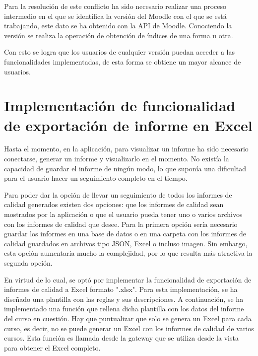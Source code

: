 Para la resolución de este conflicto ha sido necesario realizar una proceso intermedio en el que se identifica la versión del Moodle con el que se está trabajando, este dato se ha obtenido con la API de Moodle\cite{moodle-api}. Conociendo la versión se realiza la operación de obtención de índices de una forma u otra.

Con esto se logra que los usuarios de cualquier versión puedan acceder a las funcionalidades implementadas, de esta forma se obtiene un mayor alcance de usuarios.

\section{Implementación de funcionalidad de exportación de informe en Excel}
Hasta el momento, en la aplicación, para visualizar un informe ha sido necesario conectarse, generar un informe y visualizarlo en el momento. No existía la capacidad de guardar el informe de ningún modo, lo que suponía una dificultad para el usuario hacer un seguimiento completo en el tiempo. 

Para poder dar la opción de llevar un seguimiento de todos los informes de calidad generados existen dos opciones: que los informes de calidad sean mostrados por la aplicación o que el usuario pueda tener uno o varios archivos con los informes de calidad que desee. Para la primera opción sería necesario guardar los informes en una base de datos o en una carpeta con los informes de calidad guardados en archivos tipo JSON, Excel o incluso imagen. Sin embargo, esta opción aumentaría mucho la complejidad, por lo que resulta más atractiva la segunda opción.

En virtud de lo cual, se optó por implementar la funcionalidad de exportación de informes de calidad a Excel formato ".xlsx". Para esta implementación, se ha diseñado una plantilla con las reglas y sus descripciones. A continuación, se ha implementado una función que rellena dicha plantilla con los datos del informe del curso en cuestión. Hay que puntualizar que solo se genera un Excel para cada curso, es decir, no se puede generar un Excel con los informes de calidad de varios cursos. Esta función es llamada desde la gateway que se utiliza desde la vista para obtener el Excel completo. 







